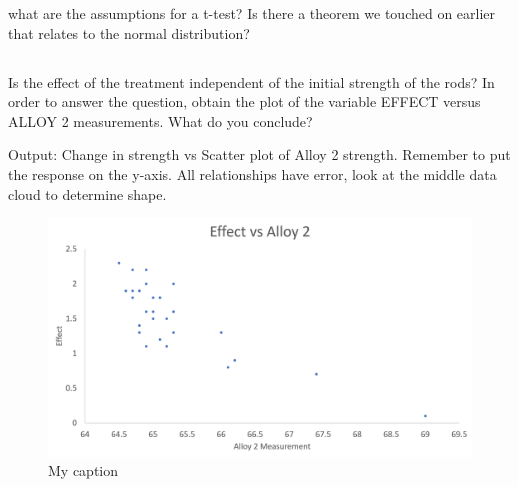 \documentclass[letterpaper]{article}
\begin{document}
what are the assumptions for a t-test? Is there a theorem we touched on earlier
that relates to the normal distribution?

\subsection{}%
Is the effect of the treatment independent of the initial strength of the rods?
In order to answer the  question, obtain the plot of the variable EFFECT versus
ALLOY 2 measurements. What do you  conclude?

Output: Change in strength vs Scatter plot of Alloy 2 strength.
Remember to put the response on the y-axis. All relationships have
error, look at the middle data cloud to determine shape.

\begin{figure}[H]
 \centering
 \includegraphics[width=\textwidth]{q6.png}
 \caption{My caption}
 \label{q6}
\end{figure}
\end{document}
